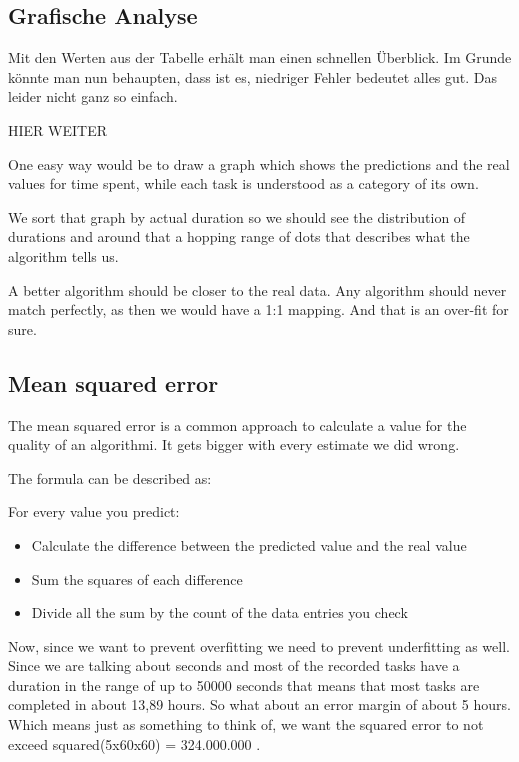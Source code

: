 \subsection{Grafische Analyse}

Mit den Werten aus der Tabelle erhält man einen schnellen Überblick. 
Im Grunde könnte man nun behaupten, dass ist es, niedriger Fehler bedeutet alles gut. 
Das leider nicht ganz so einfach.

HIER WEITER

One easy way would be to draw a graph which shows the predictions and
the real values for time spent, while each task is understood as a
category of its own.

We sort that graph by actual duration so we should see the distribution
of durations and around that a hopping range of dots that describes what
the algorithm tells us.

A better algorithm should be closer to the real data. Any algorithm
should never match perfectly, as then we would have a 1:1 mapping. And
that is an over-fit for sure.

\hypertarget{mean-squared-error}{%
\subsection{Mean squared error}\label{mean-squared-error}}

The mean squared error is a common approach to calculate a value for the
quality of an algorithmi. It gets bigger with every estimate we did
wrong.

The formula can be described as:

For every value you predict:

\begin{itemize}
\tightlist
\item
  Calculate the difference between the predicted value and the real
  value
\item
  Sum the squares of each difference
\item
  Divide all the sum by the count of the data entries you check
\end{itemize}

Now, since we want to prevent overfitting we need to prevent
underfitting as well. Since we are talking about seconds and most of the
recorded tasks have a duration in the range of up to 50000 seconds that
means that most tasks are completed in about 13,89 hours. So what about
an error margin of about 5 hours. Which means just as something to think
of, we want the squared error to not exceed squared(5x60x60) =
324.000.000 .

